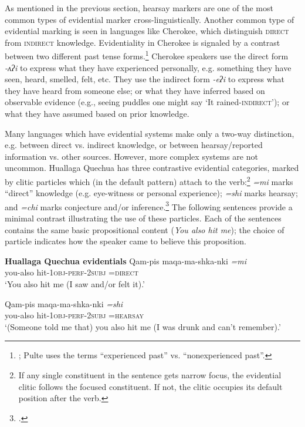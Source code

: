 As mentioned in the previous section, hearsay markers are one of the most common types of evidential marker cross-linguistically. Another common type of evidential marking is seen in languages like Cherokee, which distinguish \textsc{direct} from \textsc{indirect} knowledge. Evidentiality in Cherokee is signaled by a contrast between two different past tense forms.\footnote{\citet{Pulte1985}; Pulte uses the terms “experienced past” vs. “nonexperienced past”.} Cherokee speakers use the direct form \textit{-ʌʔi} to express what they have experienced personally, e.g. something they have seen, heard, smelled, felt, etc. They use the indirect form \textit{-eʔi} to express what they have heard from someone else; or what they have inferred based on observable evidence (e.g., seeing puddles one might say ‘It rained-\textsc{indirect}’); or what they have assumed based on prior knowledge.



Many languages which have evidential systems make only a two-way distinction, e.g. between direct vs. indirect knowledge, or between hearsay/reported information vs. other sources. However, more complex systems are not uncommon. Huallaga Quechua has three contrastive evidential categories, marked by clitic particles which (in the default pattern) attach to the verb:\footnote{If any single constituent in the sentence gets narrow focus, the evidential clitic follows the focused constituent. If not, the clitic occupies its default position after the verb.} \textit{=mi} marks “direct” knowledge (e.g. eye-witness or personal experience); \textit{=shi} marks hearsay; and \textit{=chi} marks conjecture and/or inference.\footnote{\citet{Weber1989}.} The following sentences provide a minimal contrast illustrating the use of these particles. Each of the sentences contains the same basic propositional content (\textit{You also hit me}); the choice of particle indicates how the speaker came to believe this proposition.


\ea \label{ex:17.2}

  \textbf{Huallaga Quechua evidentials} \citep[421]{Weber1989}
\ea 
\gll Qam-pis  maqa-ma-shka-nki  \textit{=mi}\\
you-also  hit-1\textsc{obj}-\textsc{perf-2subj  =direct}\\
\glt ‘You also hit me (I saw and/or felt it).’

\ex \gll Qam-pis  maqa-ma-shka-nki  \textit{=shi}\\
you-also  hit-1\textsc{obj}-\textsc{perf-2subj  =hearsay}\\
\glt ‘(Someone told me that) you also hit me (I was drunk and can’t remember).’

